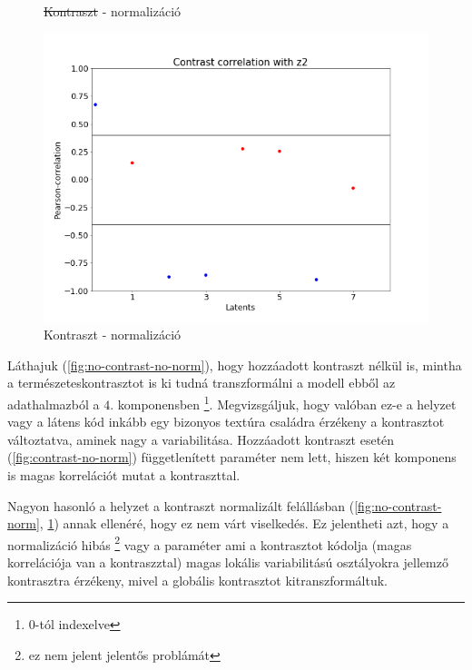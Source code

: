 \documentclass[12pt, english]{article}
\begin{document}
\begin{figure}[H]
\begin{minipage}{0.5\linewidth}
    \caption{\st{Kontraszt} - normalizáció} 
    \label{fig:no-contrast-norm}
  \end{minipage}%
  \begin{minipage}{0.5\linewidth}
    \centering
    \includegraphics[width=.72\linewidth]{contrast_to_latent/norm_contrast_correlation.png} 
    \caption{Kontraszt - normalizáció} 
    \label{fig:contrast-norm}
  \end{minipage} 
\end{figure}

\vspace{4mm}

\par Láthajuk (\ref{fig:no-contrast-no-norm}), hogy hozzáadott kontraszt nélkül is, mintha a természeteskontrasztot is ki tudná transzformálni a modell ebből az adathalmazból a $4.$ komponensben \footnote{$0$-tól indexelve}. Megvizsgáljuk, hogy valóban ez-e a helyzet vagy a látens kód inkább egy bizonyos textúra családra érzékeny a kontrasztot változtatva, aminek nagy a variabilitása. Hozzáadott kontraszt esetén (\ref{fig:contrast-no-norm}) függetlenített paraméter nem lett, hiszen két komponens is magas korrelációt mutat a kontraszttal.

\vspace{4mm}

\par Nagyon hasonló a helyzet a kontraszt normalizált felállásban (\ref{fig:no-contrast-norm}, \ref{fig:contrast-norm}) annak ellenéré, hogy ez nem várt viselkedés. Ez jelentheti azt, hogy a normalizáció hibás \footnote{ez nem jelent jelentős problámát} vagy a paraméter ami a kontrasztot kódolja (magas korrelációja van a kontraszztal) magas lokális variabilitású osztályokra jellemző kontrasztra érzékeny, mivel a globális kontrasztot kitranszformáltuk.

\vspace{4mm}
\end{document}
